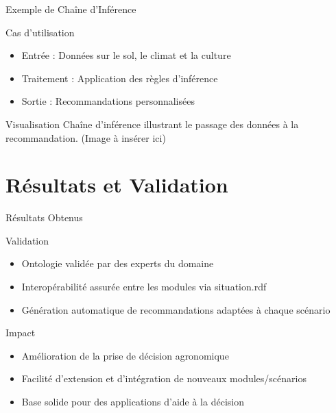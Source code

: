 \documentclass{beamer}
\begin{document}
\begin{frame}{Exemple de Chaîne d'Inférence}
  \begin{block}{Cas d'utilisation}
    \begin{itemize}
      \item Entrée : Données sur le sol, le climat et la culture
      \item Traitement : Application des règles d'inférence
      \item Sortie : Recommandations personnalisées
    \end{itemize}
  \end{block}
  \pause
  \begin{exampleblock}{Visualisation}
    \centering
    \small{Chaîne d’inférence illustrant le passage des données à la recommandation. (Image à insérer ici)}
  \end{exampleblock}
\end{frame}

\section{Résultats et Validation}

\begin{frame}{Résultats Obtenus}
  \begin{block}{Validation}
    \begin{itemize}
      \item Ontologie validée par des experts du domaine
      \item Interopérabilité assurée entre les modules via situation.rdf
      \item Génération automatique de recommandations adaptées à chaque scénario
    \end{itemize}
  \end{block}
  \pause
  \begin{alertblock}{Impact}
    \begin{itemize}
      \item Amélioration de la prise de décision agronomique
      \item Facilité d’extension et d’intégration de nouveaux modules/scénarios
      \item Base solide pour des applications d’aide à la décision
    \end{itemize}
  \end{alertblock}
\end{frame}
\end{document}
